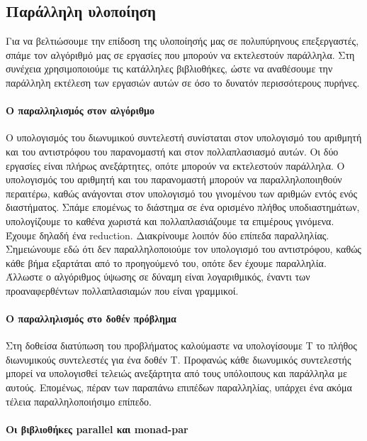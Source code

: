 \documentclass[titlepage]{article}
\begin{document}
\subsection*{Παράλληλη υλοποίηση}

Για να βελτιώσουμε την επίδοση της υλοποίησής μας σε πολυπύρηνους επεξεργαστές, σπάμε τον αλγόριθμό μας σε εργασίες που μπορούν να εκτελεστούν παράλληλα. Στη συνέχεια χρησιμοποιούμε τις κατάλληλες βιβλιοθήκες, ώστε να αναθέσουμε την παράλληλη εκτέλεση των εργασιών αυτών σε όσο το δυνατόν περισσότερους πυρήνες.

\paragraph{Ο παραλληλισμός στον αλγόριθμο}

O υπολογισμός του διωνυμικού συντελεστή συνίσταται στον υπολογισμό του αριθμητή και του αντιστρόφου του παρανομαστή και στον πολλαπλασιασμό αυτών. Οι δύο εργασίες είναι πλήρως ανεξάρτητες, οπότε μπορούν να εκτελεστούν παράλληλα. Ο υπολογισμός του αριθμητή και του παρανομαστή μπορούν να παραλληλοποιηθούν περαιτέρω, καθώς ανάγονται στον υπολογισμό του γινομένου των αριθμών εντός ενός διαστήματος. Σπάμε επομένως το διάστημα σε ένα ορισμένο πλήθος υποδιαστημάτων, υπολογίζουμε το καθένα χωριστά και πολλαπλασιάζουμε τα επιμέρους γινόμενα. Έχουμε δηλαδή ένα reduction. Διακρίνουμε λοιπόν δύο επίπεδα παραλληλίας. Σημειώνουμε εδώ ότι δεν παραλληλοποιούμε τον υπολογισμό του αντιστρόφου, καθώς κάθε βήμα εξαρτάται από το προηγούμενό του, οπότε δεν έχουμε παραλληλία. Άλλωστε ο αλγόριθμος ύψωσης σε δύναμη είναι λογαριθμικός, έναντι των προαναφερθέντων πολλαπλασιαμών που είναι γραμμικοί.

\paragraph{Ο παραλληλισμός στο δοθέν πρόβλημα}

Στη δοθείσα διατύπωση του προβλήματος καλούμαστε να υπολογίσουμε T το πλήθος διωνυμικούς συντελεστές για ένα δοθέν T. Προφανώς κάθε διωνυμικός συντελεστής μπορεί να υπολογισθεί τελειώς ανεξάρτητα από τους υπόλοιπους και παράλληλα με αυτούς. Επομένως, πέραν των παραπάνω επιπέδων παραλληλίας, υπάρχει ένα ακόμα τέλεια παραλληλοποιήσιμο επίπεδο.

\paragraph{Οι βιβλιοθήκες parallel και monad-par}
\end{document}
